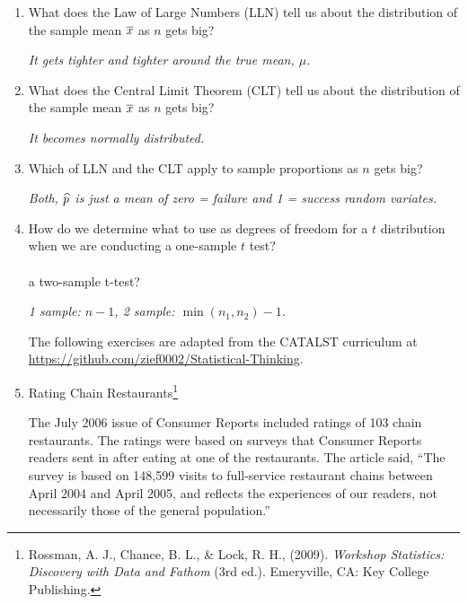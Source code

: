 \begin{enumerate}
  \item What does the Law of Large Numbers (LLN) tell us about the
    distribution of the sample mean $\overline{x}$ as $n$ gets big?\\
\begin{key}
 {\it  It gets tighter and tighter around the true mean, $\mu$.}      
\end{key}
  \item What does the Central Limit Theorem (CLT) tell us about the
    distribution of the sample mean $\overline{x}$ as $n$ gets big?\\

\begin{key}
 {\it  It becomes normally distributed.  }      
\end{key}
   \item Which of  LLN and the CLT apply to sample
    proportions as $n$ gets big? \\
\begin{key}
 {\it Both, $\widehat{p}$ is just a mean of zero = failure and 1 = success
   random variates. }      
\end{key}
   \item How do we determine what to use as degrees of freedom for a
    $t$ distribution when we are conducting a one-sample $t$ test?\\
    \\ a two-sample t-test?\\

\begin{key}
 {\it 1 sample: $n-1$, 2 sample: $\min(n_1, n_2) -1$. }      
\end{key}

The following exercises are adapted from the CATALST curriculum at
\url{https://github.com/zief0002/Statistical-Thinking}. 

   \item Rating Chain Restaurants\footnote{ Rossman, A. J., Chance,
      B. L., \& Lock, R. H., (2009). {\it Workshop Statistics:
        Discovery with Data and Fathom}  (3rd ed.). Emeryville, CA:
      Key College Publishing. } 

    The July 2006 issue of Consumer Reports included ratings of 103
    chain restaurants. The ratings were based on surveys that Consumer
    Reports readers sent in after eating at one of the
    restaurants. The article said, ``The survey is based on 148,599
    visits to full-service restaurant chains between April 2004 and
    April 2005, and reflects the experiences of our readers, not
    necessarily those of the general population.''


\end{enumerate}
